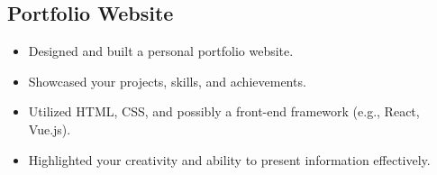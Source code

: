 \documentclass[]{deedy-resume-openfont}
\begin{document}
\begin{minipage}[t]{0.66\textwidth}
\subsection*{Portfolio Website}
\begin{itemize}
	\item Designed and built a personal portfolio website.
	\item Showcased your projects, skills, and achievements.
	\item Utilized HTML, CSS, and possibly a front-end framework (e.g., React, Vue.js).
	\item Highlighted your creativity and ability to present information effectively.
\end{itemize}

\end{minipage} 
\end{document}
